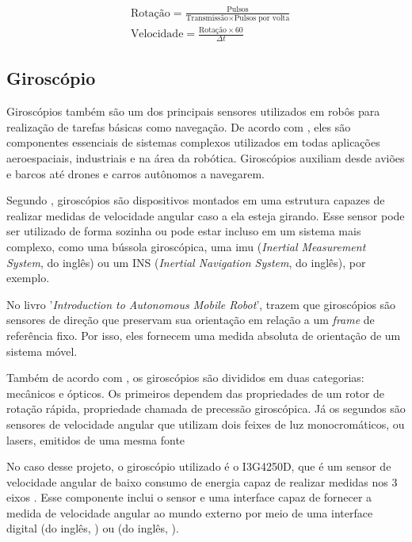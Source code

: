 \documentclass[acronym, symbols, table]{fei}
\begin{document}
				\begin{equation}\label{eq:velocidade_roda_encoder}
					\begin{split}
						&\text{Rotação} = \frac{\text{Pulsos}}{\text{Transmissão} \times \text{Pulsos por volta}} \\
						&\text{Velocidade} = \frac{\text{Rotação} \times 60}{\Delta t}
					\end{split}
				\end{equation}
			
			\subsection{Giroscópio} \label{sec:sensores_giroscopio}
			
				Giroscópios também são um dos principais sensores utilizados em robôs para realização de tarefas básicas como navegação. De acordo com \textcite{jeremydingman2020}, eles são componentes essenciais de sistemas complexos utilizados em todas aplicações aeroespaciais, industriais e na área da robótica. Giroscópios auxiliam desde aviões e barcos até drones e carros autônomos a navegarem.
				
				Segundo \textcite{s17102284}, giroscópios são dispositivos montados em uma estrutura capazes de realizar medidas de velocidade angular caso a ela esteja girando. Esse sensor pode ser utilizado de forma sozinha ou pode estar incluso em um sistema mais complexo, como uma bússola giroscópica, uma \acrshort{imu} (\textit{Inertial Measurement System}, do inglês) ou um INS (\textit{Inertial Navigation System}, do inglês), por exemplo.
				
				No livro '\textit{Introduction to Autonomous Mobile Robot}', \textcite{siegwart2011introduction} trazem que giroscópios são sensores de direção que preservam sua orientação em relação a um \textit{frame} de referência fixo. Por isso, eles fornecem uma medida absoluta de orientação de um sistema móvel. 
				
				Também de acordo com \textcite{siegwart2011introduction}, os giroscópios são divididos em duas categorias: mecânicos e ópticos. Os primeiros dependem das propriedades de um rotor de rotação rápida, propriedade chamada de precessão giroscópica. Já os segundos são sensores de velocidade angular que utilizam dois feixes de luz monocromáticos, ou lasers, emitidos de uma mesma fonte
				
				No caso desse projeto, o giroscópio utilizado é o I3G4250D, que é um sensor de velocidade angular de baixo consumo de energia capaz de realizar medidas nos 3 eixos \cite{datasheet_gyro}. Esse componente inclui o sensor e uma interface capaz de fornecer a medida de velocidade angular ao mundo externo por meio de uma interface digital  (do inglês, ) ou  (do inglês, ).
			
\end{document}
